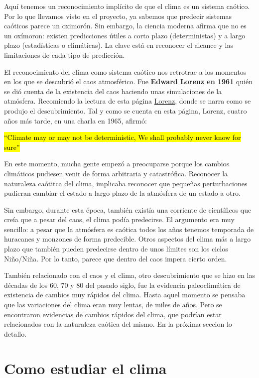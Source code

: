 \documentclass[
  10pt,
  a4paper,
  DIV=11,
  numbers=noendperiod,
  open=any]{scrreprt}
\numberwithin{equation}{chapter}
\numberwithin{equation}{chapter}
\renewcommand{\[}{\begin{equation}}
\renewcommand{\]}{\end{equation}}
\begin{document}
Aquí tenemos un reconocimiento implícito de que el clima es un sistema
caótico. Por lo que llevamos visto en el proyecto, ya sabemos que
predecir sistemas caóticos parece un oximorón. Sin embargo, la ciencia
moderna afirma que no es un oxímoron: existen predicciones útiles a
corto plazo (deterministas) y a largo plazo (estadísticas o climáticas).
La clave está en reconocer el alcance y las limitaciones de cada tipo de
predicción.

El reconocimiento del clima como sistema caótico nos retrotrae a los
momentos en los que se descubrió el caos atmosférico. Fue \textbf{Edward
Lorenz en 1961} quién se dió cuenta de la existencia del caos haciendo
unas simulaciones de la atmósfera. Recomiendo la lectura de esta página
\href{https://history.aip.org/climate/chaos.htm}{Lorenz}, donde se narra
como se produjo el descubrimiento. Tal y como se cuenta en esta página,
Lorenz, cuatro años más tarde, en una charla en 1965, afirmó:

\hl{``Climate may or may not be deterministic, We shall probably never
know for sure''}

En este momento, mucha gente empezó a preocuparse porque los cambios
climáticos pudiesen venir de forma arbitraria y catastrófica. Reconocer
la naturaleza caótitca del clima, implicaba reconocer que pequeñas
perturbaciones pudieran cambiar el estado a largo plazo de la atmósfera
de un estado a otro.

Sin embargo, durante esta época, también existía una corriente de
científicos que creía que a pesar del caos, el clima podía predecirse.
El argumento era muy sencillo: a pesar que la atmósfera es caótica todos
los años tenemos temporada de huracanes y monzones de forma predecible.
Otros aspectos del clima más a largo plazo que también pueden predecirse
dentro de unos límites son los ciclos Niño/Niña. Por lo tanto, parece
que dentro del caos impera cierto orden.

También relacionado con el caos y el clima, otro descubrimiento que se
hizo en las décadas de los 60, 70 y 80 del pasado siglo, fue la
evidencia paleoclimática de existencia de cambios muy rápidos del clima.
Hasta aquel momento se pensaba que las variaciones del clima eran muy
lentas, de miles de años. Pero se encontraron evidencias de cambios
rápidos del clima, que podrían estar relacionados con la naturaleza
caótica del mismo. En la próxima seccion lo detallo.

\section{Como estudiar el clima}\label{como-estudiar-el-clima}
\end{document}
